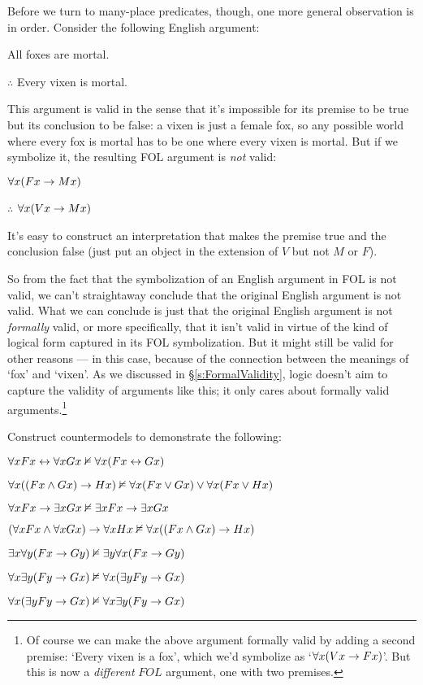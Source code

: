 Before we turn to many-place predicates, though, one more general observation is in order.  Consider the following English argument:
\begin{earg}
	\item[] All foxes are mortal.
	\item[$\therefore$] Every vixen is mortal.
\end{earg}
This argument is valid in the sense that it's impossible for its premise to be true but its conclusion to be false: a vixen is just a female fox, so any possible world where every fox is mortal has to be one where every vixen is mortal.  But if we symbolize it, the resulting FOL argument is \emph{not} valid:
\begin{earg}
	\item[] $\forall x(Fx \rightarrow Mx)$
	\item[$\therefore$] $\forall x(Vx \rightarrow Mx)$
\end{earg}
It's easy to construct an interpretation that makes the premise true and the conclusion false (just put an object in the extension of $V$ but not $M$ or $F$).

So from the fact that the symbolization of an English argument in FOL is not valid, we can't straightaway conclude that the original English argument is not valid.   What we can conclude is just that the original English argument is not \emph{formally} valid, or more specifically, that it isn't valid in virtue of the kind of logical form captured in its FOL symbolization.  But it might still be valid for other reasons --- in this case, because of the connection between the meanings of `fox' and `vixen'.  As we discussed in \S\ref{s:FormalValidity}, logic doesn't aim to capture the validity of arguments like this; it only cares about formally valid arguments.\footnote{Of course we can make the above argument formally valid by adding a second premise: `Every vixen is a fox', which we'd symbolize as `$\forall x(Vx \rightarrow Fx)$'.  But this is now a \emph{different}  $FOL$ argument, one with two premises.}

\practiceproblems
\problempart Construct countermodels to demonstrate the following:

\begin{earg}
\item $\forall xFx \leftrightarrow \forall x Gx \nvDash \forall x(Fx \leftrightarrow Gx)$ %
\item $\forall x ((Fx \wedge Gx) \rightarrow Hx) \nvDash \forall x(Fx \vee Gx) \vee \forall x(Fx \vee Hx)$ %
\item $\forall xFx \rightarrow \exists xGx \nvDash \exists x Fx \rightarrow \exists x Gx$ %
\item $(\forall x Fx \wedge \forall x Gx) \rightarrow \forall x Hx \nvDash \forall x((Fx \wedge Gx) \rightarrow Hx)$ %
\item $\exists x\forall y(Fx \rightarrow Gy) \nvDash \exists y\forall x(Fx \rightarrow Gy)$
\item $\forall x \exists y(Fy \rightarrow Gx) \nvDash \forall x(\exists yFy \rightarrow Gx)$ %
\item $\forall x(\exists yFy \rightarrow Gx) \nvDash \forall x \exists y(Fy \rightarrow Gx)$
\end{earg}



